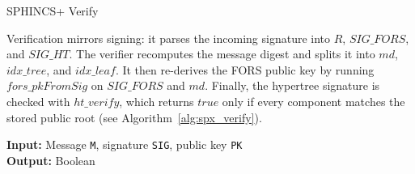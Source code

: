 \documentclass [version=submission]{iacrcc}
\begin{document}
\begin{subsection}{SPHINCS+ Verify}

Verification mirrors signing: it parses the incoming signature into \(R\), \(\mathit{SIG\_FORS}\), and \(\mathit{SIG\_HT}\). The verifier recomputes the message digest and splits it into \(\mathit{md}\), \(\mathit{idx\_tree}\), and \(\mathit{idx\_leaf}\). It then re-derives the FORS public key by running \(\mathit{fors\_pkFromSig}\) on \(\mathit{SIG\_FORS}\) and \(\mathit{md}\). Finally, the hypertree signature is checked with \(\mathit{ht\_verify}\), which returns \(\mathit{true}\) only if every component matches the stored public root (see Algorithm~\ref{alg:spx_verify}).

\begin{algorithm}
    \caption{spx\_verify -- Verify a SPHINCS+ signature SIG on a message M using a SPHINCS+ public key PK}
    \label{alg:spx_verify}
    \textbf{Input:} Message \texttt{M}, signature \texttt{SIG}, public key \texttt{PK} \\
    \textbf{Output:} Boolean

    \vspace{0.2cm}


\end{algorithm}
\end{subsection}
\end{document}
